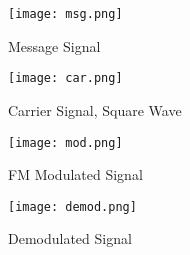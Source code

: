 \begin{figure}[H]
    \centering
    \texttt{[image: msg.png]}
    \caption{Message Signal}
    \label{fig:img2}
\end{figure}

\begin{figure}[H]
    \centering
    \texttt{[image: car.png]}
    \caption{Carrier Signal, Square Wave}
    \label{fig:img11}
\end{figure}

\begin{figure}[H]
    \centering
    \texttt{[image: mod.png]}
    \caption{FM Modulated Signal}
    \label{fig:img3}
\end{figure}

\begin{figure}[H]
    \centering
    \texttt{[image: demod.png]}
    \caption{Demodulated Signal}
    \label{fig:img4}
\end{figure}
